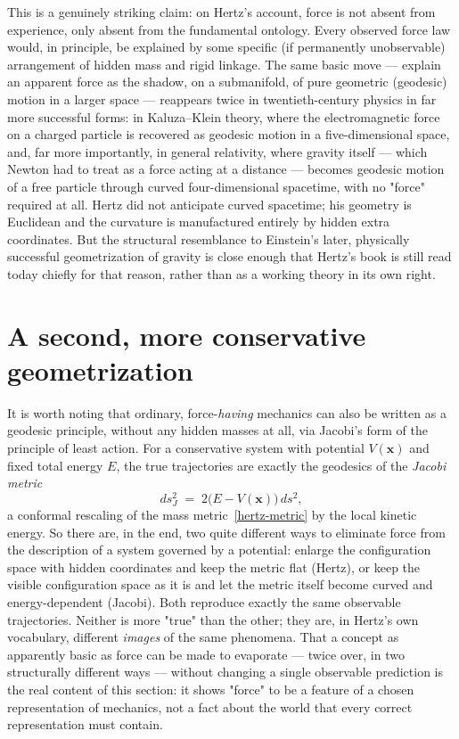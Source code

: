 This is a genuinely striking claim: on Hertz's account, force is not
absent from experience, only absent from the fundamental ontology.
Every observed force law would, in principle, be explained by some
specific (if permanently unobservable) arrangement of hidden mass
and rigid linkage. The same basic move --- explain an apparent force
as the shadow, on a submanifold, of pure geometric (geodesic) motion
in a larger space --- reappears twice in twentieth-century physics
in far more successful forms: in Kaluza--Klein theory, where the
electromagnetic force on a charged particle is recovered as geodesic
motion in a five-dimensional space, and, far more importantly, in
general relativity, where gravity itself --- which Newton had to
treat as a force acting at a distance --- becomes geodesic motion of
a free particle through curved four-dimensional spacetime, with no
"force" required at all. Hertz did not anticipate curved spacetime;
his geometry is Euclidean and the curvature is manufactured entirely
by hidden extra coordinates. But the structural resemblance to
Einstein's later, physically successful geometrization of gravity is
close enough that Hertz's book is still read today chiefly for that
reason, rather than as a working theory in its own
right.

\section{A second, more conservative geometrization}

It is worth noting that ordinary, force-\emph{having} mechanics can
also be written as a geodesic principle, without any hidden masses
at all, via Jacobi's form of the principle of least action. For a
conservative system with potential $V(\mathbf x)$ and fixed total
energy $E$, the true trajectories are exactly the geodesics of the
\emph{Jacobi metric}
\begin{equation}
  ds_J^2 \;=\; 2\bigl(E-V(\mathbf x)\bigr)\, ds^2 ,
  \label{jacobi-metric}
\end{equation}
a conformal rescaling of the mass metric~\eqref{hertz-metric} by
the local kinetic energy. So there are, in the end, two quite
different ways to eliminate force from the description of a system
governed by a potential: enlarge the configuration space with hidden
coordinates and keep the metric flat (Hertz), or keep the visible
configuration space as it is and let the metric itself become curved
and energy-dependent (Jacobi). Both reproduce exactly the same
observable trajectories. Neither is more "true" than the other; they
are, in Hertz's own vocabulary, different \emph{images} of the same
phenomena. That a concept as apparently basic as force can be made
to evaporate --- twice over, in two structurally different ways ---
without changing a single observable prediction is the real content
of this section: it shows "force" to be a feature of a chosen
representation of mechanics, not a fact about the world that every
correct representation must contain.


